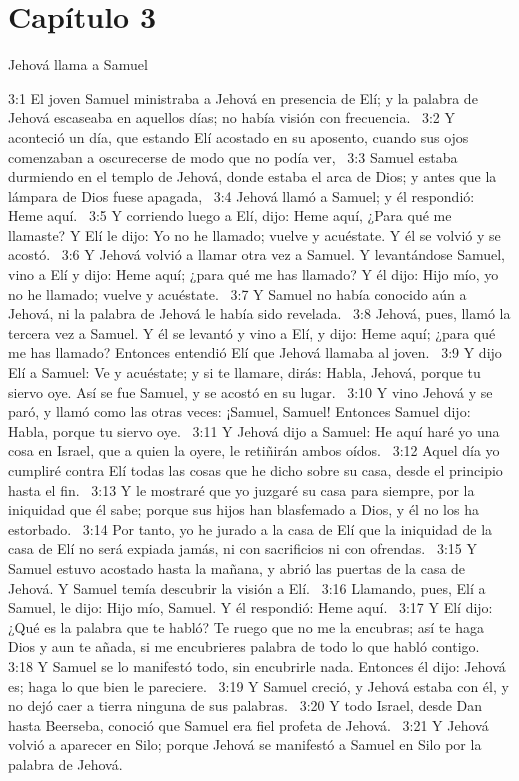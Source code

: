 \section*{Capítulo 3}
Jehová llama a Samuel  

3:1 El joven Samuel ministraba a Jehová en presencia de Elí; y la palabra de Jehová escaseaba en aquellos días; no había visión con frecuencia.  
3:2 Y aconteció un día, que estando Elí acostado en su aposento, cuando sus ojos comenzaban a oscurecerse de modo que no podía ver,  
3:3 Samuel estaba durmiendo en el templo de Jehová, donde estaba el arca de Dios; y antes que la lámpara de Dios fuese apagada,  
3:4 Jehová llamó a Samuel; y él respondió: Heme aquí.  
3:5 Y corriendo luego a Elí, dijo: Heme aquí, ¿Para qué me llamaste? Y Elí le dijo: Yo no he llamado; vuelve y acuéstate. Y él se volvió y se acostó.  
3:6 Y Jehová volvió a llamar otra vez a Samuel. Y levantándose Samuel, vino a Elí y dijo: Heme aquí; ¿para qué me has llamado? Y él dijo: Hijo mío, yo no he llamado; vuelve y acuéstate.  
3:7 Y Samuel no había conocido aún a Jehová, ni la palabra de Jehová le había sido revelada.  
3:8 Jehová, pues, llamó la tercera vez a Samuel. Y él se levantó y vino a Elí, y dijo: Heme aquí; ¿para qué me has llamado? Entonces entendió Elí que Jehová llamaba al joven.  
3:9 Y dijo Elí a Samuel: Ve y acuéstate; y si te llamare, dirás: Habla, Jehová, porque tu siervo oye. Así se fue Samuel, y se acostó en su lugar.  
3:10 Y vino Jehová y se paró, y llamó como las otras veces: ¡Samuel, Samuel! Entonces Samuel dijo: Habla, porque tu siervo oye.  
3:11 Y Jehová dijo a Samuel: He aquí haré yo una cosa en Israel, que a quien la oyere, le retiñirán ambos oídos.  
3:12 Aquel día yo cumpliré contra Elí todas las cosas que he dicho sobre su casa, desde el principio hasta el fin.  
3:13 Y le mostraré que yo juzgaré su casa para siempre, por la iniquidad que él sabe; porque sus hijos han blasfemado a Dios, y él no los ha estorbado.  
3:14 Por tanto, yo he jurado a la casa de Elí que la iniquidad de la casa de Elí no será expiada jamás, ni con sacrificios ni con ofrendas.  
3:15 Y Samuel estuvo acostado hasta la mañana, y abrió las puertas de la casa de Jehová. Y Samuel temía descubrir la visión a Elí.  
3:16 Llamando, pues, Elí a Samuel, le dijo: Hijo mío, Samuel. Y él respondió: Heme aquí.  
3:17 Y Elí dijo: ¿Qué es la palabra que te habló? Te ruego que no me la encubras; así te haga Dios y aun te añada, si me encubrieres palabra de todo lo que habló contigo.  
3:18 Y Samuel se lo manifestó todo, sin encubrirle nada. Entonces él dijo: Jehová es; haga lo que bien le pareciere.  
3:19 Y Samuel creció, y Jehová estaba con él, y no dejó caer a tierra ninguna de sus palabras.  
3:20 Y todo Israel, desde Dan hasta Beerseba, conoció que Samuel era fiel profeta de Jehová.  
3:21 Y Jehová volvió a aparecer en Silo; porque Jehová se manifestó a Samuel en Silo por la palabra de Jehová.  
